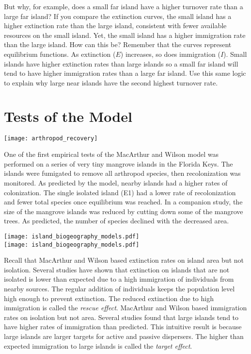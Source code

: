 \documentclass{tufte-handout}
\begin{document}
But why, for example, does a small far island have a higher turnover rate than a large far island?  If you compare the extinction curves, the small island has a higher extinction rate than the large island, consistent with fewer available resources on the small island. Yet, the small island has a higher immigration rate than the large island. How can this be? Remember that the curves represent equilibrium functions. As extinction ($E$) increases, so does immigration ($I$). Small islands have higher extinction rates than large islands so a small far island will tend to have higher immigration rates than a large far island.  Use this same logic to explain why large near islands have the second highest turnover rate.

\section{Tests of the Model}

\begin{marginfigure}%
	\centering
	\texttt{[image: arthropod\_recovery]}
\end{marginfigure} 

One of the first empirical tests of the MacArthur and Wilson model was performed on a series of very tiny mangrove islands in the Florida Keys. The islands were fumigated to remove all arthropod species, then recolonization was monitored. As predicted by the model, nearby islands had a higher rates of colonization. The single isolated island (E1) had a lower rate of recolonization and fewer total species once equilibrium was reached. In a companion study, the size of the mangrove islands was reduced by cutting down some of the mangrove trees. As predicted, the number of species declined with the decreased area.

\begin{marginfigure}%
	\centering
	\texttt{[image: island\_biogeography\_models.pdf]}\\
	\texttt{[image: island\_biogeography\_models.pdf]}\\
\end{marginfigure} 

Recall that MacArthur and Wilson based extinction rates on island area but not isolation.  Several studies have shown that extinction on islands that are not isolated is lower than expected due to a high immigration of individuals from nearby sources. The regular addition of individuals keeps the population level high enough to prevent extinction. The reduced extinction due to high immigration is called the \textit{rescue effect}.  MacArthur and Wilson based immigration rates on isolation but not area.  Several studies found that large islands tend to have higher rates of immigration than predicted. This intuitive result is because large islands are larger targets for active and passive dispersers.  The higher than expected immigration to large islands is called the \textit{target effect}.
\end{document}
